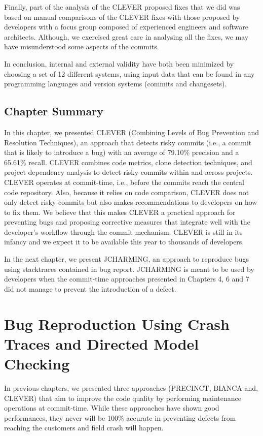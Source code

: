 \documentclass[12pt]{report}
\begin{document}
Finally, part of the analysis of the CLEVER proposed fixes that we did
was based on manual comparisons of the CLEVER fixes with those proposed
by developers with a focus group composed of experienced engineers and
software architects. Although, we exercised great care in analysing all
the fixes, we may have misunderstood some aspects of the commits.

In conclusion, internal and external validity have both been minimized
by choosing a set of 12 different systems, using input data that can be
found in any programming languages and version systems (commits and
changesets).

\section{Chapter Summary}\label{chapter-summary-3}

In this chapter, we presented CLEVER (Combining Levels of Bug Prevention
and Resolution Techniques), an approach that detects risky commits
(i.e., a commit that is likely to introduce a bug) with an average of
79.10\% precision and a 65.61\% recall. CLEVER combines code metrics,
clone detection techniques, and project dependency analysis to detect
risky commits within and across projects. CLEVER operates at
commit-time, i.e., before the commits reach the central code repository.
Also, because it relies on code comparison, CLEVER does not only detect
risky commits but also makes recommendations to developers on how to fix
them. We believe that this makes CLEVER a practical approach for
preventing bugs and proposing corrective measures that integrate well
with the developer's workflow through the commit mechanism. CLEVER is
still in its infancy and we expect it to be available this year to
thousands of developers.

In the next chapter, we present JCHARMING, an approach to reproduce bugs
using stacktraces contained in bug report. JCHARMING is meant to be used
by developers when the commit-time approaches presented in Chapters 4, 6
and 7 did not manage to prevent the introduction of a defect.

\chapter{Bug Reproduction Using Crash Traces and Directed Model
Checking}\label{bug-reproduction-using-crash-traces-and-directed-model-checking}

In previous chapters, we presented three approaches (PRECINCT, BIANCA
and, CLEVER) that aim to improve the code quality by performing
maintenance operations at commit-time. While these approaches have shown
good performances, they never will be 100\% accurate in preventing
defects from reaching the customers and field crash will happen.
\end{document}
